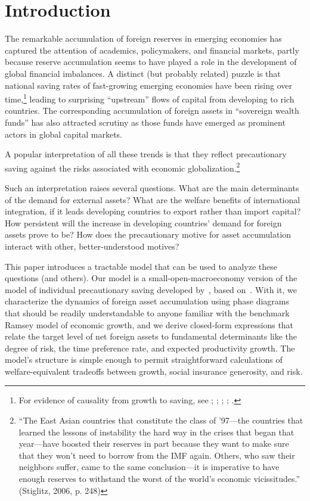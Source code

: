 \documentclass[titlepage]{\econtex}\newcommand{\texname}{cjSOE}
\begin{document}
\section{Introduction} 

The remarkable accumulation of foreign reserves in emerging
economies has captured the attention of academics, policymakers, and
financial markets, partly because reserve accumulation seems to have
played a role in the development of global financial imbalances.  A
distinct (but probably related) puzzle is that national saving rates
of fast-growing emerging economies have been rising over
time,\footnote{For evidence of causality from growth to saving, see
  \cite{carroll&weil:crcs}; \cite{lss:whatdrives}; \cite{aps:sgi};
  \cite{hprGrowth}; \cite{gourinchasJeannePuzzle}.} leading to
surprising ``upstream'' flows of capital from developing to rich
countries.  The corresponding accumulation of foreign assets in
``sovereign wealth funds'' has also attracted scrutiny as those
funds have emerged as prominent actors in global capital markets.

A popular interpretation of all these trends is that they
reflect precautionary saving against the risks associated with
economic globalization.\footnote{``The East Asian countries that constitute the class of '97---the countries that learned the lessons
of instability the hard way in the crises that began that year---have boosted their reserves in part because they want to make sure that they won't need
to borrow from the IMF again. Others, who saw their neighbors suffer, came to the same conclusion---it is imperative to have enough reserves
to withstand the worst of the world's economic vicissitudes.'' (Stiglitz, 2006, p. 248)}

Such an interpretation raises several questions. What are the main
determinants of the demand for external assets?  What are the welfare
benefits of international integration, if it leads developing
countries to export rather than import capital?  How persistent will
the increase in developing countries' demand for foreign assets
prove to be?  How does the precautionary motive for asset
accumulation interact with other, better-understood motives?

This paper introduces a tractable model that can be used to analyze
these questions (and others). Our model is a small-open-macroeconomy
version of the model of individual precautionary saving developed
by~\cite{carrollTractable}, based on~\cite{toche:urisk}. With it, 
we characterize the dynamics of foreign asset accumulation
using phase diagrams that should be readily understandable to anyone
familiar with the benchmark Ramsey model of economic growth, and we 
derive closed-form expressions that relate the target level of net
foreign assets to fundamental determinants like the degree of risk,
the time preference rate, and expected productivity growth.  The
model's structure is simple enough to permit straightforward
calculations of welfare-equivalent tradeoffs between growth, social
insurance generosity, and risk.
\end{document}
